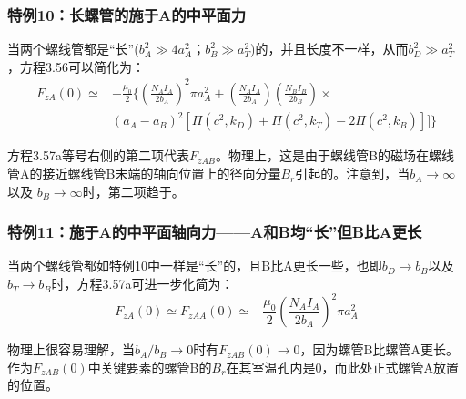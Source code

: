 \subsubsection{特例10：长螺管的施于A的中平面力}
当两个螺线管都是“长”($b_A^2\gg 4a_A^2；b_B^2\gg a_T^2$)的，并且长度不一样，从而$b_D^2\gg a_T^2$，方程3.56可以简化为：
\begin{equation}
\begin{split}
F_{zA}(0)\simeq& -\frac{\mu_0}{2}\{(\frac{N_AI_A}{2b_A})^2\pi a_A^2+(\frac{N_AI_A}{2b_A})(\frac{N_BI_B}{2b_{B}})\times\\
&(a_A-a_B)^2[\Pi(c^2,k_D)+\Pi(c^2,k_T)-2\Pi(c^2,k_B)]]\}
\end{split}
\end{equation}

方程3.57a等号右侧的第二项代表$F_{zAB}$。物理上，这是由于螺线管B的磁场在螺线管A的接近螺线管B末端的轴向位置上的径向分量$B_r$引起的。注意到，当$b_A\rightarrow \infty$以及 $b_B\rightarrow \infty$时，第二项趋于。
\subsubsection{特例11：施于A的中平面轴向力——A和B均“长”但B比A更长}
当两个螺线管都如特例10中一样是“长”的，且B比A更长一些，也即$b_D\rightarrow b_B$以及$b_T\rightarrow b_B$时，方程3.57a可进一步化简为：
\begin{equation}
F_{zA}(0)\simeq F_{zAA}(0)\simeq -\frac{\mu_0}{2}(\frac{N_AI_A}{2b_A})^2\pi a_A^2
\end{equation}

物理上很容易理解，当$b_A/b_B\rightarrow 0$时有$F_{zAB}(0)\rightarrow 0$，因为螺管B比螺管A更长。作为$F_{zAB}(0)$中关键要素的螺管B的$B_r$在其室温孔内是0，而此处正式螺管A放置的位置。

